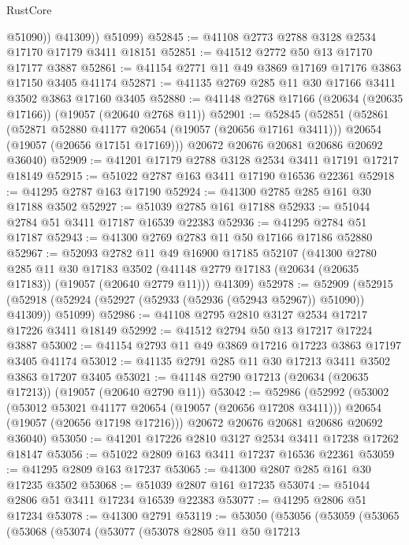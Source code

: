 \begin{lexlean}{RustCore}
\begin{coremodule}
              @51090))
          @41309))
      @51099)
@52845 := @41108 @2773 @2788 @3128 @2534 @17170 @17179 @3411 @18151
@52851 := @41512 @2772 @50 @13 @17170 @17177 @3887
@52861 := @41154 @2771 @11 @49 @3869 @17169 @17176 @3863 @17150 @3405 @41174
@52871 := @41135 @2769 @285 @11 @30 @17166 @3411 @3502 @3863 @17160 @3405
@52880 := @41148 @2768 @17166 (@20634 (@20635 @17166)) (@19057 (@20640 @2768 @11))
@52901 := @52845
    (@52851
      (@52861
        (@52871 @52880 @41177 @20654 (@19057 (@20656 @17161 @3411)))
        @20654
        (@19057 (@20656 @17151 @17169)))
      @20672
      @20676
      @20681
      @20686
      @20692
      @36040)
@52909 := @41201 @17179 @2788 @3128 @2534 @3411 @17191 @17217 @18149
@52915 := @51022 @2787 @163 @3411 @17190 @16536 @22361
@52918 := @41295 @2787 @163 @17190
@52924 := @41300 @2785 @285 @161 @30 @17188 @3502
@52927 := @51039 @2785 @161 @17188
@52933 := @51044 @2784 @51 @3411 @17187 @16539 @22383
@52936 := @41295 @2784 @51 @17187
@52943 := @41300 @2769 @2783 @11 @50 @17166 @17186 @52880
@52967 := @52093
    @2782
    @11
    @49
    @16900
    @17185
    @52107
    (@41300
      @2780
      @285
      @11
      @30
      @17183
      @3502
      (@41148 @2779 @17183 (@20634 (@20635 @17183)) (@19057 (@20640 @2779 @11)))
      @41309)
@52978 := @52909
    (@52915 (@52918 (@52924 (@52927 (@52933 (@52936 (@52943 @52967)) @51090)) @41309)) @51099)
@52986 := @41108 @2795 @2810 @3127 @2534 @17217 @17226 @3411 @18149
@52992 := @41512 @2794 @50 @13 @17217 @17224 @3887
@53002 := @41154 @2793 @11 @49 @3869 @17216 @17223 @3863 @17197 @3405 @41174
@53012 := @41135 @2791 @285 @11 @30 @17213 @3411 @3502 @3863 @17207 @3405
@53021 := @41148 @2790 @17213 (@20634 (@20635 @17213)) (@19057 (@20640 @2790 @11))
@53042 := @52986
    (@52992
      (@53002
        (@53012 @53021 @41177 @20654 (@19057 (@20656 @17208 @3411)))
        @20654
        (@19057 (@20656 @17198 @17216)))
      @20672
      @20676
      @20681
      @20686
      @20692
      @36040)
@53050 := @41201 @17226 @2810 @3127 @2534 @3411 @17238 @17262 @18147
@53056 := @51022 @2809 @163 @3411 @17237 @16536 @22361
@53059 := @41295 @2809 @163 @17237
@53065 := @41300 @2807 @285 @161 @30 @17235 @3502
@53068 := @51039 @2807 @161 @17235
@53074 := @51044 @2806 @51 @3411 @17234 @16539 @22383
@53077 := @41295 @2806 @51 @17234
@53078 := @41300 @2791
@53119 := @53050
    (@53056
      (@53059
        (@53065
          (@53068
            (@53074
              (@53077
                (@53078
                  @2805
                  @11
                  @50
                  @17213

\end{coremodule}
\end{lexlean}

